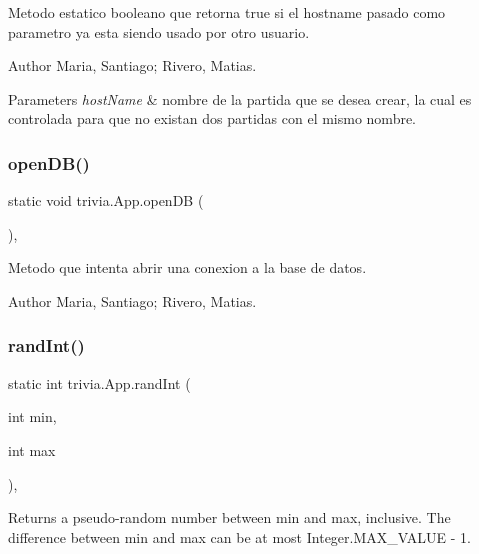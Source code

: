 Metodo estatico booleano que retorna true si el hostname pasado como parametro ya esta siendo usado por otro usuario. \begin{DoxyAuthor}{Author}
Maria, Santiago; Rivero, Matias. 
\end{DoxyAuthor}

\begin{DoxyParams}{Parameters}
{\em host\+Name} & nombre de la partida que se desea crear, la cual es controlada para que no existan dos partidas con el mismo nombre. \\
\hline
\end{DoxyParams}
\mbox{\label{classtrivia_1_1App_a626312af5afd16555429d2241273d85d}} 
\subsubsection{\texorpdfstring{open\+D\+B()}{openDB()}}
{\footnotesize\ttfamily static void trivia.\+App.\+open\+DB (\begin{DoxyParamCaption}{ }\end{DoxyParamCaption})\hspace{0.3cm}{\ttfamily [inline]}, {\ttfamily [static]}}

Metodo que intenta abrir una conexion a la base de datos. \begin{DoxyAuthor}{Author}
Maria, Santiago; Rivero, Matias. 
\end{DoxyAuthor}
\mbox{\label{classtrivia_1_1App_adcedb003b5a5fa73689c3d7a276f9530}} 
\subsubsection{\texorpdfstring{rand\+Int()}{randInt()}}
{\footnotesize\ttfamily static int trivia.\+App.\+rand\+Int (\begin{DoxyParamCaption}\item[{int}]{min,  }\item[{int}]{max }\end{DoxyParamCaption})\hspace{0.3cm}{\ttfamily [inline]}, {\ttfamily [static]}}

Returns a pseudo-\/random number between min and max, inclusive. The difference between min and max can be at most {\ttfamily Integer.\+M\+A\+X\+\_\+\+V\+A\+L\+UE -\/ 1}.


